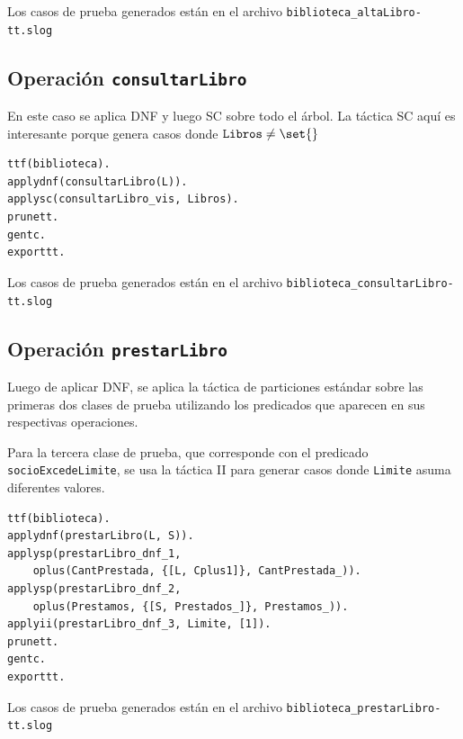 \documentclass{article}
\begin{document}
\sloppy Los casos de prueba generados están en el archivo \verb|biblioteca_altaLibro-tt.slog|

\subsection*{Operación \texttt{consultarLibro}}
En este caso se aplica DNF y luego SC sobre todo el árbol. La táctica SC aquí es interesante porque genera casos donde $\texttt{Libros} \neq \set{}$

\begin{verbatim}
ttf(biblioteca).
applydnf(consultarLibro(L)).
applysc(consultarLibro_vis, Libros).
prunett.
gentc.
exporttt.
\end{verbatim}

\sloppy Los casos de prueba generados están en el archivo \verb|biblioteca_consultarLibro-tt.slog|

\subsection*{Operación \texttt{prestarLibro}}
Luego de aplicar DNF, se aplica la táctica de particiones estándar sobre las primeras dos clases de prueba utilizando los predicados que aparecen en sus respectivas operaciones.

Para la tercera clase de prueba, que corresponde con el predicado \texttt{socioExcedeLimite}, se usa la táctica II para generar casos donde \texttt{Limite} asuma diferentes valores.

\begin{verbatim}
ttf(biblioteca).
applydnf(prestarLibro(L, S)).
applysp(prestarLibro_dnf_1, 
    oplus(CantPrestada, {[L, Cplus1]}, CantPrestada_)).
applysp(prestarLibro_dnf_2, 
    oplus(Prestamos, {[S, Prestados_]}, Prestamos_)).
applyii(prestarLibro_dnf_3, Limite, [1]).
prunett.
gentc.
exporttt.
\end{verbatim}

\sloppy Los casos de prueba generados están en el archivo \verb|biblioteca_prestarLibro-tt.slog|
\end{document}
